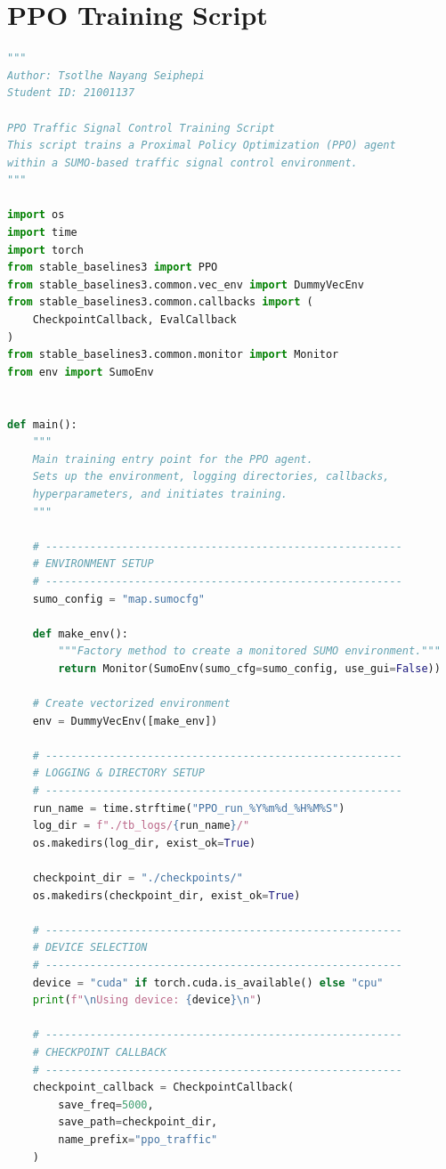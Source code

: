 \documentclass[11pt, a4paper]{report}
\begin{document}
\appendix

\chapter{PPO Training Script}

\begin{lstlisting}[language=Python, caption={PPO Training Script --- Tsotlhe N. Seiphepi (ID: 21001137)}]
"""
Author: Tsotlhe Nayang Seiphepi
Student ID: 21001137

PPO Traffic Signal Control Training Script
This script trains a Proximal Policy Optimization (PPO) agent
within a SUMO-based traffic signal control environment.
"""

import os
import time
import torch
from stable_baselines3 import PPO
from stable_baselines3.common.vec_env import DummyVecEnv
from stable_baselines3.common.callbacks import (
    CheckpointCallback, EvalCallback
)
from stable_baselines3.common.monitor import Monitor
from env import SumoEnv


def main():
    """
    Main training entry point for the PPO agent.
    Sets up the environment, logging directories, callbacks,
    hyperparameters, and initiates training.
    """

    # --------------------------------------------------------
    # ENVIRONMENT SETUP
    # --------------------------------------------------------
    sumo_config = "map.sumocfg"

    def make_env():
        """Factory method to create a monitored SUMO environment."""
        return Monitor(SumoEnv(sumo_cfg=sumo_config, use_gui=False))

    # Create vectorized environment
    env = DummyVecEnv([make_env])

    # --------------------------------------------------------
    # LOGGING & DIRECTORY SETUP
    # --------------------------------------------------------
    run_name = time.strftime("PPO_run_%Y%m%d_%H%M%S")
    log_dir = f"./tb_logs/{run_name}/"
    os.makedirs(log_dir, exist_ok=True)

    checkpoint_dir = "./checkpoints/"
    os.makedirs(checkpoint_dir, exist_ok=True)

    # --------------------------------------------------------
    # DEVICE SELECTION
    # --------------------------------------------------------
    device = "cuda" if torch.cuda.is_available() else "cpu"
    print(f"\nUsing device: {device}\n")

    # --------------------------------------------------------
    # CHECKPOINT CALLBACK
    # --------------------------------------------------------
    checkpoint_callback = CheckpointCallback(
        save_freq=5000,
        save_path=checkpoint_dir,
        name_prefix="ppo_traffic"
    )


\end{lstlisting}
\end{document}
